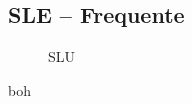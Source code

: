 \clearpage	
\begin{landscape}
\subsection*{SLE -- Frequente}
\begin{figure}[H]
\centering
{} 
\caption{SLU}
\label{fig:Momenti_SLSfrequent}
\end{figure}
\begin{table}[H]
\centering
\caption{boh}
	\begin{tabular}{lS[table-format=3.2]S[table-format=3.2]S[table-format=3.2]S[table-format=3.2]S[table-format=3.2]S[table-format=3.2]S[table-format=3.2]S[table-format=3.2]S[table-format=3.2]S[table-format=3.2]S[table-format=3.2]S[table-format=3.2]S[table-format=3.2]}

\end{tabular}
\end{table}
\end{landscape}

